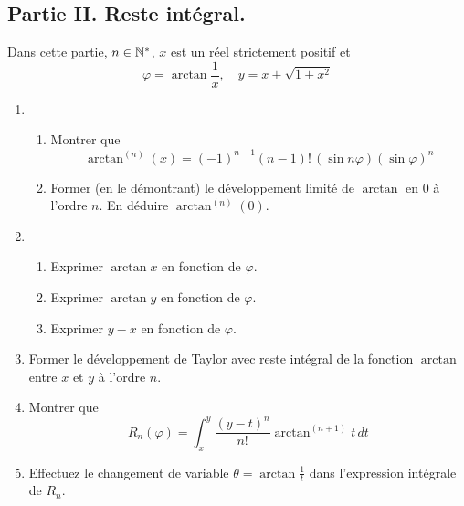 \subsection*{Partie II. Reste intégral.}
Dans cette partie, $n\in \mathbb{N}^*$, $x$ est un réel strictement positif et 
\begin{displaymath}
 \varphi = \arctan \frac{1}{x} ,\quad y = x+ \sqrt{1+x^2}
\end{displaymath}
\begin{enumerate}
 \item \begin{enumerate}
 \item Montrer que
\begin{displaymath}
 \arctan^{(n)}(x)=(-1)^{n-1}(n-1)!\,(\sin n\varphi)(\sin \varphi)^n
\end{displaymath}
 \item Former (en le démontrant) le développement limité de $\arctan$ en $0$ à l'ordre $n$. En déduire $\arctan^{(n)}(0)$.
\end{enumerate}

\item \begin{enumerate}
 \item Exprimer $\arctan x$ en fonction de $\varphi$.
 \item Exprimer $\arctan y$ en fonction de $\varphi$.
 \item Exprimer $y- x$ en fonction de $\varphi$.
\end{enumerate}

\item Former le développement de Taylor avec reste intégral de la fonction $\arctan$ entre $x$ et $y$ à l'ordre $n$.
\item Montrer que
\begin{displaymath}
 R_n(\varphi)= \int_{x}^y \frac{(y-t)^n}{n!}\arctan^{(n+1)}t\, dt
\end{displaymath}
\item Effectuez le changement de variable $ \theta = \arctan \frac{1}{t}$ dans l'expression intégrale de $R_n$.

\end{enumerate}


